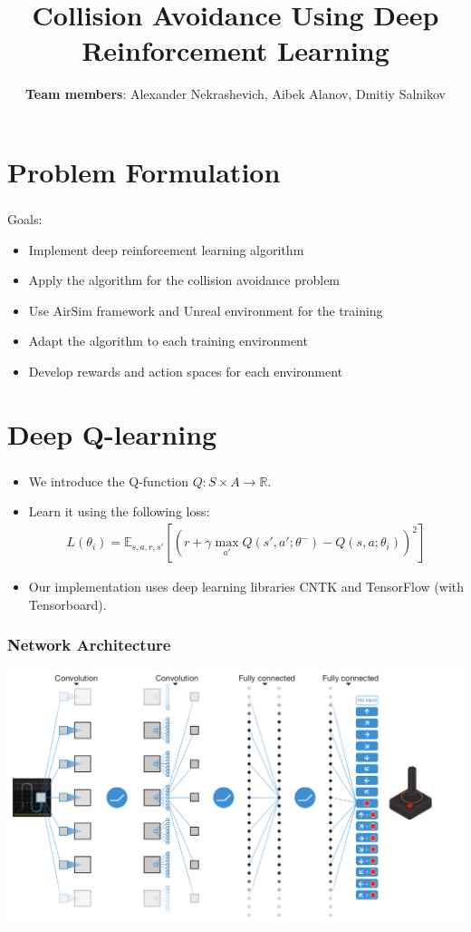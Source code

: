 \documentclass[t]{beamer}
\title[RL] %
{\textbf{Collision Avoidance Using Deep Reinforcement Learning}}
\author[]
{
	\footnotesize {\textbf{Team members}: Alexander Nekrashevich, Aibek Alanov, Dmitiy Salnikov}
}
\institute{}
\date{}
\begin{document}
{

\frame[plain]
{
	\titlepage
}
}

\section{Problem Formulation}

\begin{frame}
	\frametitle{\insertsection}
	Goals:
	\begin{itemize}
		\item Implement deep reinforcement learning algorithm
		\item Apply the algorithm for the collision avoidance problem
		\item Use AirSim framework and Unreal environment for the training
		\item Adapt the algorithm to each training environment
		\item Develop rewards and action spaces for each environment
	\end{itemize}
\end{frame}

\section{Deep Q-learning}

\begin{frame}
	\frametitle{\insertsection}
	\begin{itemize}
		\item We introduce the Q-function $Q: S \times A \to \mathbb{R}$.
		\item Learn it using the following loss:
		\begin{align*}
			L(\theta_i) = \mathbb{E}_{s,a,r,s'} \left[ \left(r + \gamma \max_{a'}Q(s', a'; \theta^{-}) - Q(s, a; \theta_i) \right)^2 \right]
		\end{align*}
		\item Our implementation uses deep learning libraries CNTK
and TensorFlow (with Tensorboard).
	\end{itemize}
\end{frame}

\begin{frame}
	\frametitle{Network Architecture}
	\includegraphics[scale=0.27]{images/dqn_crop.png}
\end{frame}
\end{document}
